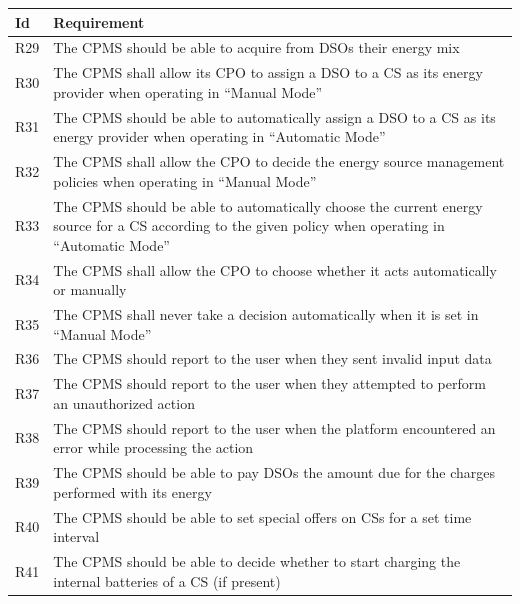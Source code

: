 \documentclass[11pt]{article}
\begin{document}
\begin{table}[H]
    \centering
    \setlength{\tabcolsep}{18pt}
    \renewcommand{\arraystretch}{1.2}
    \begin{tabularx}{\textwidth}{|>{\centering\hsize=0.1\hsize}X|>{\hsize=1.9\hsize}X|}
        \hline
        \textbf{Id} & \textbf{Requirement} \\
        \hline
        R29 & The CPMS should be able to acquire from DSOs their energy mix \\
        \hline
        R30 & The CPMS shall allow its CPO to assign a DSO to a CS as its energy provider  when operating in “Manual Mode” \\
        \hline
        R31 & The CPMS should be able to automatically assign a DSO to a CS as its energy provider when operating in “Automatic Mode” \\
        \hline
        R32 & The CPMS shall allow the CPO to decide the energy source management policies when operating in “Manual Mode” \\
        \hline
        R33 & The CPMS should be able to automatically choose the current energy source for a CS according to the given policy when operating in “Automatic Mode” \\
        \hline
        R34 & The CPMS shall allow the CPO to choose whether it acts automatically or manually \\
        \hline
        R35 & The CPMS shall never take a decision automatically when it is set in “Manual Mode” \\
        \hline
        R36 & The CPMS should report to the user when they sent invalid input data \\
        \hline
        R37 & The CPMS should report to the user when they attempted to perform an unauthorized action \\
        \hline
        R38 & The CPMS should report to the user when the platform encountered an error while processing the action \\
        \hline
        R39 & The CPMS should be able to pay DSOs the amount due for the charges performed with its energy \\
        \hline
        R40 & The CPMS should be able to set special offers on CSs for a set time interval \\
        \hline
        R41 & The CPMS should be able to decide whether to start charging the internal batteries of a CS (if present) \\
        \hline
    \end{tabularx}
    \label{tab:requirements-2}
\end{table}
\end{document}
